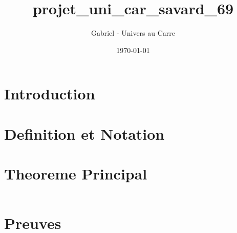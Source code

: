 \documentclass[12pt]{article}
\title{projet_uni_car_savard_69}
\author{Gabriel - Univers au Carre}
\date{\today}
\begin{document}
\maketitle


\section{Introduction}



\section{Definition et Notation}



\section{Theoreme Principal}


\begin{equation}
\end{equation}


\section{Preuves}


\end{document}
